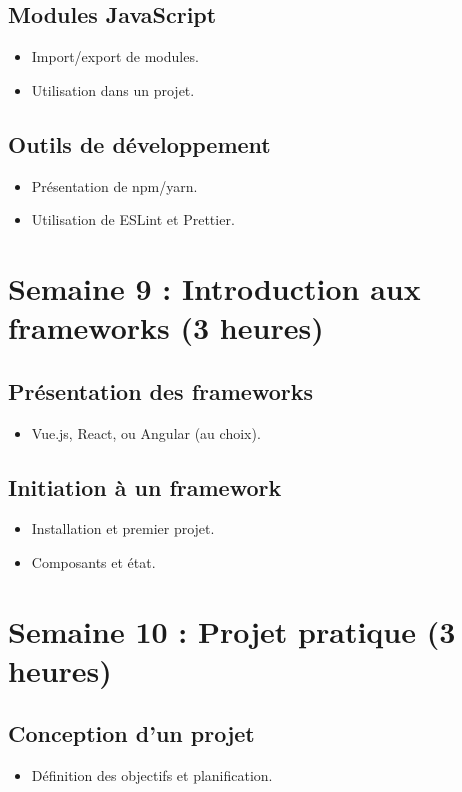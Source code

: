 \documentclass[12pt]{article}
\begin{document}
\subsection*{Modules JavaScript }
\begin{itemize}
    \item Import/export de modules.
    \item Utilisation dans un projet.
\end{itemize}

\subsection*{Outils de développement }
\begin{itemize}
    \item Présentation de npm/yarn.
    \item Utilisation de ESLint et Prettier.
\end{itemize}

\section*{Semaine 9 : Introduction aux frameworks (3 heures)}
\subsection*{Présentation des frameworks }
\begin{itemize}
    \item Vue.js, React, ou Angular (au choix).
\end{itemize}

\subsection*{Initiation à un framework }
\begin{itemize}
    \item Installation et premier projet.
    \item Composants et état.
\end{itemize}

\section*{Semaine 10 : Projet pratique (3 heures)}
\subsection*{Conception d'un projet }
\begin{itemize}
    \item Définition des objectifs et planification.
\end{itemize}
\end{document}
